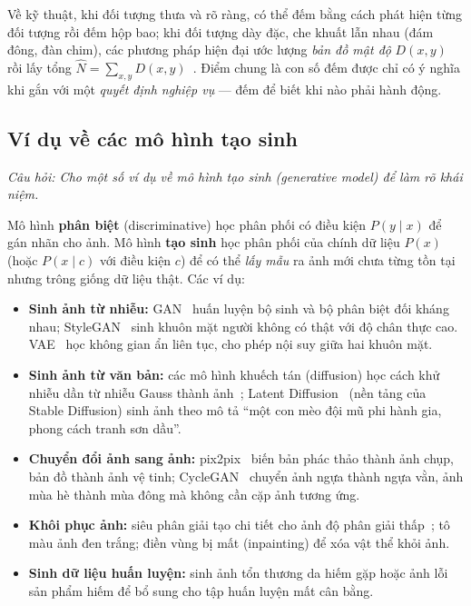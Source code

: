 Về kỹ thuật, khi đối tượng thưa và rõ ràng, có thể đếm bằng cách phát hiện từng đối tượng rồi đếm hộp bao; khi đối tượng dày đặc, che khuất lẫn nhau (đám đông, đàn chim), các phương pháp hiện đại ước lượng \emph{bản đồ mật độ} $D(x, y)$ rồi lấy tổng $\hat{N} = \sum_{x,y} D(x, y)$~\citep{li2018csrnet}. Điểm chung là con số đếm được chỉ có ý nghĩa khi gắn với một \emph{quyết định nghiệp vụ} — đếm để biết khi nào phải hành động.

\subsection{Ví dụ về các mô hình tạo sinh}
\label{subsec:w2_generative}

\textit{Câu hỏi: Cho một số ví dụ về mô hình tạo sinh (generative model) để làm rõ khái niệm.}

Mô hình \textbf{phân biệt} (discriminative) học phân phối có điều kiện $P(y \mid x)$ để gán nhãn cho ảnh. Mô hình \textbf{tạo sinh} học phân phối của chính dữ liệu $P(x)$ (hoặc $P(x \mid c)$ với điều kiện $c$) để có thể \emph{lấy mẫu} ra ảnh mới chưa từng tồn tại nhưng trông giống dữ liệu thật. Các ví dụ:

\begin{itemize}
    \item \textbf{Sinh ảnh từ nhiễu:} GAN~\citep{goodfellow2014generative} huấn luyện bộ sinh và bộ phân biệt đối kháng nhau; StyleGAN~\citep{karras2019style} sinh khuôn mặt người không có thật với độ chân thực cao. VAE~\citep{kingma2014auto} học không gian ẩn liên tục, cho phép nội suy giữa hai khuôn mặt.
    \item \textbf{Sinh ảnh từ văn bản:} các mô hình khuếch tán (diffusion) học cách khử nhiễu dần từ nhiễu Gauss thành ảnh~\citep{ho2020denoising}; Latent Diffusion~\citep{rombach2022high} (nền tảng của Stable Diffusion) sinh ảnh theo mô tả ``một con mèo đội mũ phi hành gia, phong cách tranh sơn dầu''.
    \item \textbf{Chuyển đổi ảnh sang ảnh:} pix2pix~\citep{isola2017image} biến bản phác thảo thành ảnh chụp, bản đồ thành ảnh vệ tinh; CycleGAN~\citep{zhu2017unpaired} chuyển ảnh ngựa thành ngựa vằn, ảnh mùa hè thành mùa đông mà không cần cặp ảnh tương ứng.
    \item \textbf{Khôi phục ảnh:} siêu phân giải tạo chi tiết cho ảnh độ phân giải thấp~\citep{ledig2017photo}; tô màu ảnh đen trắng; điền vùng bị mất (inpainting) để xóa vật thể khỏi ảnh.
    \item \textbf{Sinh dữ liệu huấn luyện:} sinh ảnh tổn thương da hiếm gặp hoặc ảnh lỗi sản phẩm hiếm để bổ sung cho tập huấn luyện mất cân bằng.
\end{itemize}

